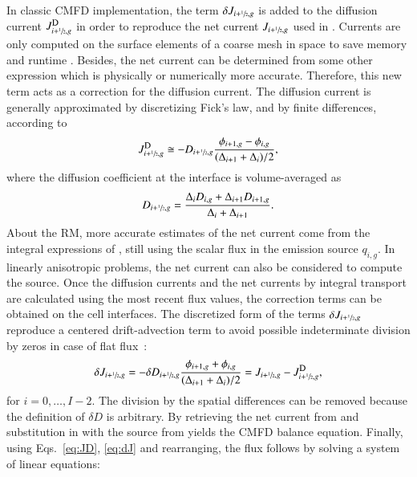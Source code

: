 In classic CMFD implementation, the term $\delta J_{i+\sfrac{1}{2},g}$ is added to the diffusion current $\jD_{i+\hzi,g}$ in order to reproduce the net current $J_{i+\sfrac{1}{2},g}$ used in . Currents are only computed on the surface elements of a coarse mesh in space to save memory and runtime \cite{Smith-1983}. Besides, the net current can be determined from some other expression which is physically or numerically more accurate. Therefore, this new term acts as a correction for the diffusion current. The diffusion current is generally approximated by discretizing Fick's law, and by finite differences, according to
\begin{equation}
  \label{eq:JD}
  \jD_{i+\hzi,g} \cong - D_{i+\hzi,g}
    \frac{\phi_{i+1,g} - \phi_{i,g}}{(\Delta_{i+1} + \Delta_i)/2},
\end{equation}
where the diffusion coefficient at the interface is volume-averaged as
\begin{equation}
  \label{eq:Ds}
  D_{i+\sfrac{1}{2},g} = \frac{\Delta_i D_{i,g} + \Delta_{i+1} D_{i+1,g}}
{\Delta_i + \Delta_{i+1}}.
\end{equation}
%
About the RM, more accurate estimates of the net current come from the integral expressions of , still using the scalar flux in the emission source $q_{i,g}$. In linearly anisotropic problems, the net current can also be considered to compute the source. Once the diffusion currents and the net currents by integral transport are calculated using the most recent flux values, the correction terms can be obtained on the cell interfaces. The discretized form of the terms $\delta J_{i+\sfrac{1}{2},g}$ reproduce a centered drift-advection term to avoid possible indeterminate division by zeros in case of flat flux~\cite{Smith-1983,Tomatis-2011}:
\begin{equation}
  \label{eq:dJ}
  \delta J_{i+\hzi,g} = -\delta D_{i+\hzi,g}
    \frac{\phi_{i+1,g} + \phi_{i,g}}{(\Delta_{i+1} + \Delta_i)/2} =
  J_{i+\hzi,g} - \jD_{i+\hzi,g},
\end{equation}
for $i = 0, \ldots, I-2$. The division by the spatial differences can be removed because the definition of $\delta D$ is arbitrary. By retrieving the net current from  and substitution in  with the source from  yields the CMFD balance equation. Finally, using Eqs.~\eqref{eq:JD}, \eqref{eq:dJ} and rearranging, the flux follows by solving a system of linear equations:
%
